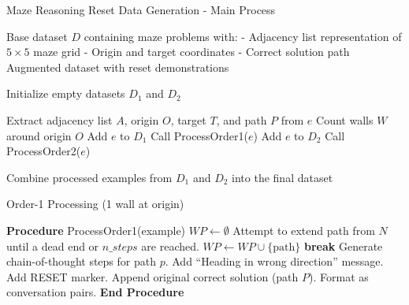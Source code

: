 
\begin{algorithm}
\caption{Maze Reasoning Reset Data Generation - Main Process}
\label{alg:main}
\begin{algorithmic}[1]
\REQUIRE Base dataset $D$ containing maze problems with:
    \STATE \quad - Adjacency list representation of $5 \times 5$ maze grid
    \STATE \quad - Origin and target coordinates
    \STATE \quad - Correct solution path
\ENSURE Augmented dataset with reset demonstrations

\STATE Initialize empty datasets $D_1$ and $D_2$

    \STATE Extract adjacency list $A$, origin $O$, target $T$, and path $P$ from $e$
    \STATE Count walls $W$ around origin $O$
        \STATE Add $e$ to $D_1$
        \STATE Call ProcessOrder1($e$) 
        \STATE Add $e$ to $D_2$
        \STATE Call ProcessOrder2($e$) 
    \ENDIF
\ENDFOR

\STATE Combine processed examples from $D_1$ and $D_2$ into the final dataset
\end{algorithmic}
\end{algorithm}

\begin{algorithm}
\caption{Order-1 Processing (1 wall at origin)}
\label{alg:order1}
\begin{algorithmic}[1]
\STATE \textbf{Procedure} ProcessOrder1(example)
    \STATE $WP \leftarrow \emptyset$ 
                \STATE Attempt to extend path from $N$ until a dead end or $n\_steps$ are reached.
                    \STATE $WP \leftarrow WP \cup \{\text{path}\}$
                    \STATE \textbf{break}
                \ENDIF
            \ENDFOR
        \ENDIF
    \ENDFOR
        \STATE Generate chain-of-thought steps for path $p$.
        \STATE Add ``Heading in wrong direction'' message.
        \STATE Add RESET marker.
    \ENDFOR
    \STATE Append original correct solution (path $P$).
    \STATE Format as conversation pairs.
\STATE \textbf{End Procedure}
\end{algorithmic}
\end{algorithm}


